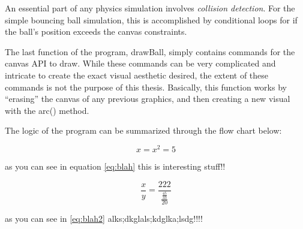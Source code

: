 An essential part of any physics simulation involves \textit{collision detection}.  For the simple bouncing ball simulation, this is accomplished by conditional loops for if the ball's position exceeds the canvas constraints.  


The last function of the program, drawBall, simply contains commands for the canvas API to draw.  While these commands can be very complicated and intricate to create the exact visual aesthetic desired, the extent of these commands is not the purpose of this thesis.  Basically, this function works by ``erasing'' the canvas of any previous graphics, and then creating a new visual with the arc() method.   

The logic of the program can be summarized through the flow chart below:














\begin{equation} \label{eq:blah}
x = x^2 = 5
\end{equation}

as you can see in equation \ref{eq:blah} this is interesting stuff!!


\begin{equation} \label{eq:blah2}
\frac{x}{y} = \frac{222}{\frac{\frac{45}{33}}{20}}
\end{equation}

as you can see in  \ref{eq:blah2}  alks;dkglals;kdglka;lsdg!!!!


